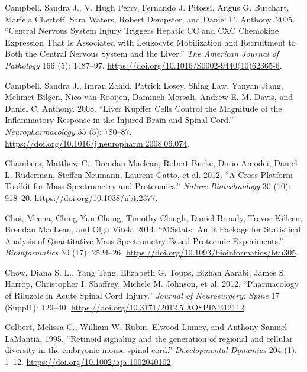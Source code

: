 \documentclass[9pt,lineno]{elife}
\newlength{\cslhangindent}
\newlength{\cslentryspacingunit} %
\newenvironment{CSLReferences}[2] %
 {%
  \setlength{\parindent}{0pt}
  \ifodd #1
  \let\oldpar\par
  \def\par{\hangindent=\cslhangindent\oldpar}
  \fi
  \setlength{\parskip}{#2\cslentryspacingunit}
 }%
 {}
\begin{document}
\begin{landscape}
\begin{landscape}
\begin{CSLReferences}{1}{0}
\leavevmode{}%
Campbell, Sandra J., V. Hugh Perry, Fernando J. Pitossi, Angus G. Butchart, Mariela Chertoff, Sara Waters, Robert Dempster, and Daniel C. Anthony. 2005. {``Central {Nervous System Injury Triggers Hepatic CC} and {CXC Chemokine Expression} That {Is Associated} with {Leukocyte Mobilization} and {Recruitment} to {Both} the {Central Nervous System} and the {Liver}.''} \emph{The American Journal of Pathology} 166 (5): 1487--97. \url{https://doi.org/10.1016/S0002-9440(10)62365-6}.

\leavevmode{}%
Campbell, Sandra J., Imran Zahid, Patrick Losey, Shing Law, Yanyan Jiang, Mehmet Bilgen, Nico van Rooijen, Damineh Morsali, Andrew E. M. Davis, and Daniel C. Anthony. 2008. {``Liver {Kupffer} Cells Control the Magnitude of the Inflammatory Response in the Injured Brain and Spinal Cord.''} \emph{Neuropharmacology} 55 (5): 780--87. \url{https://doi.org/10.1016/j.neuropharm.2008.06.074}.

\leavevmode{}%
Chambers, Matthew C., Brendan Maclean, Robert Burke, Dario Amodei, Daniel L. Ruderman, Steffen Neumann, Laurent Gatto, et al. 2012. {``A Cross-Platform Toolkit for Mass Spectrometry and Proteomics.''} \emph{Nature Biotechnology} 30 (10): 918--20. \url{https://doi.org/10.1038/nbt.2377}.

\leavevmode{}%
Choi, Meena, Ching-Yun Chang, Timothy Clough, Daniel Broudy, Trevor Killeen, Brendan MacLean, and Olga Vitek. 2014. {``{MSstats}: An {R} Package for Statistical Analysis of Quantitative Mass Spectrometry-Based Proteomic Experiments.''} \emph{Bioinformatics} 30 (17): 2524--26. \url{https://doi.org/10.1093/bioinformatics/btu305}.

\leavevmode{}%
Chow, Diana S. L., Yang Teng, Elizabeth G. Toups, Bizhan Aarabi, James S. Harrop, Christopher I. Shaffrey, Michele M. Johnson, et al. 2012. {``Pharmacology of Riluzole in Acute Spinal Cord Injury.''} \emph{Journal of Neurosurgery: Spine} 17 (Suppl1): 129--40. \url{https://doi.org/10.3171/2012.5.AOSPINE12112}.

\leavevmode{}%
Colbert, Melissa C., William W. Rubin, Elwood Linney, and Anthony-Samuel LaMantia. 1995. {``{Retinoid signaling and the generation of regional and cellular diversity in the embryonic mouse spinal cord}.''} \emph{Developmental Dynamics} 204 (1): 1--12. \url{https://doi.org/10.1002/aja.1002040102}.


\end{CSLReferences}
\end{landscape}
\end{landscape}
\end{document}
